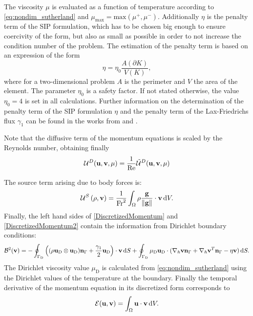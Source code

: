 The viscosity $\mu$ is evaluated as a function of temperature according to \cref{eq:nondim_sutherland} and $\mu_{\text{max}} = \text{max}(\mu^{+}, \mu^{-})$.  Additionally  $\eta$ is the penalty term of the \gls{SIP} formulation, which has to be chosen big enough to ensure coercivity of the form, but also as small as possible in order to not increase the condition number of the problem. The estimation of the penalty term is based on an expression of the form
\begin{equation}
	\eta = \eta_0 \frac{A(\partial K)}{V(K)},
\end{equation}\label{eq:PenaltyFactor}
where for a two-dimensional problem $A$ is the perimeter and $V$ the area of the element. The parameter $\eta_0$ is a safety factor. If not stated otherwise, the value  $\eta_0 = 4$ is  set in all calculations. Further information on the determination of the penalty term of the SIP formulation $\eta$ and the penalty term of the Lax-Friedrichs  flux $\gamma_1 $ can be found in  the works from \textcite{hesthavenNodalDiscontinuousGalerkin2008} and \textcite{hillewaertDevelopmentDiscontinuousGalerkin2013}.

Note that the diffusive term of the momentum equations is scaled by the Reynolds number, obtaining finally
\begin{equation}
		\mathcal{U}^D(\textbf{u},\textbf{v},\mu) = 	\frac{1}{\text{Re}}\tilde{\mathcal{U}}^D(\textbf{u},\textbf{v},\mu)
\end{equation}

The source term arising due to body forces is:
\begin{equation}
	\mathcal{U}^S\left(\rho, \textbf{v}\right) =  \smash{\frac{1}{\text{Fr}^2}}\int_{\Omega}{  \rho \frac{\textbf{g}}{\Vert \textbf{g} \Vert}\cdot \textbf{v}} \,\mathrm{d} V.  \label{eq:Mom_source}
\end{equation}
Finally, the left hand sides of \cref{DiscretizedMomentum} and \cref{DiscretizedMomentum2} contain the information from Dirichlet boundary conditions:
\begin{equation}
	\mathcal{B}^2(\textbf{v}) =
	-\oint_{\Gamma_{\text{D}}}{ \left( (\rho\textbf{u}_{\text{D}}\otimes\textbf{u}_{\text{D}} )\textbf{n}_{\Gamma} + \frac{\gamma_1}{2}\textbf{u}_{\text{D}}\right)\cdot\textbf{v} \,\mathrm{d} S}  +
	\oint_{\Gamma_{\text{D}}}{\mu_{\text{D}}\textbf{u}_{\text{D}}\cdot(\nabla_h\textbf{v} \textbf{n}_{\Gamma} + \nabla_h\textbf{v}^T \textbf{n}_{\Gamma}- \eta \textbf{v} )\,\mathrm{d} S.}
\end{equation}
The Dirichlet viscosity value $\mu_{\text{D}}$ is calculated from \cref{eq:nondim_sutherland} using the Dirichlet values of the temperature at the boundary.
Finally the temporal derivative of the momentum equation in its discretized form corresponds to
\begin{equation}
\mathcal{E} (\textbf{u},\textbf{v}) =   \int_{\Omega}{\textbf{u}\cdot\textbf{v}} \,\mathrm{d} V.
\end{equation}
